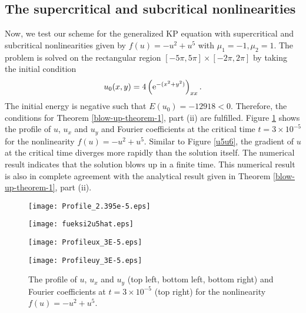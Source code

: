\documentclass[10pt]{article}
\numberwithin{equation}{section}
\newcommand{\ee}{{\rm e}}
\begin{document}
	\subsection{The  supercritical and subcritical nonlinearities} 
	Now,   we test our scheme for the generalized KP equation with supercritical and subcritical nonlinearities given by \mbox{$f(u)=-u^2+u^5$} with $\mu_1=-1, \mu_2=1$. The problem is solved on the rectangular region $[-5\pi, 5\pi]\times [-2\pi, 2\pi]$  by taking the initial condition \begin{equation}
		u_0(x,y)=4\left(\ee^ {-({x^2}+{y^2})}\right)_{xx} . \label{initialuminus2u5}
	\end{equation}
	The initial energy is negative such that $E(u_0)=-12918<0$.   Therefore, the conditions for Theorem \ref{blow-up-theorem-1}, part (ii) are fulfilled. 
	Figure \ref{uminus2u5} shows the profile of  $ u $,   $ u_x $ and $ u_y $   and  Fourier coefficients  at the critical time \mbox{$t=3\times 10^{-5}$} for the nonlinearity $f(u)=-u^2+u^5$. Similar to Figure \ref{u5u6}, the gradient of $u$  at the critical time diverges more rapidly than the solution itself. The numerical result indicates that the solution blows up in a finite time. This numerical result is also in complete agreement with the analytical result given in Theorem \ref{blow-up-theorem-1}, part (ii).
	\begin{figure}[!htbp]
		\begin{minipage}[t]{0.45\linewidth}
			\centering
			\texttt{[image: Profile\_2.395e-5.eps]}
		\end{minipage}%
		\hspace{20pt}
		\begin{minipage}[t]{0.45\linewidth}
			\centering
			\texttt{[image: fueksi2u5hat.eps]}
		\end{minipage}
		\begin{minipage}[t]{0.45\linewidth}
			\centering
			\texttt{[image: Profileux\_3E-5.eps]}
		\end{minipage}%
		\hspace{40pt}
		\begin{minipage}[t]{0.45\linewidth}
			\centering
			\texttt{[image: Profileuy\_3E-5.eps]}
		\end{minipage}
		\caption{ The profile of  $ u $,   $ u_x $ and $ u_y $  (top left, bottom left, bottom right)  and  Fourier coefficients  at $t=3\times 10^{-5}$ (top right) for the nonlinearity $f(u)=-u^2+u^5$.}\label{uminus2u5}
	\end{figure}
	
\end{document}

